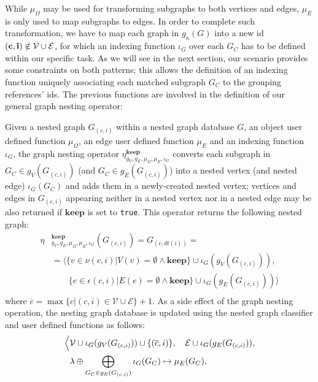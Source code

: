 While $\mu_\Omega$ may be used for transforming subgraphs to both vertices and edges, $\mu_E$ is only used to map subgraphs to edges.  
In order to complete such transformation, we have to map each graph in $g_\kappa(G)$ into a new id $(\textbf{c},\textbf{i})\notin \mathcal{V}\cup \mathcal{E}$, for which an indexing function $\iota_G$ over each $G_C$ has to be defined within our specific task. As we will see in the next section, our scenario provides some constraints on both patterns; this allows the definition of an indexing function  uniquely associating each matched subgraph  $G_C$  to the grouping references' ids.
The previous functions are involved in the definition of our general graph nesting operator:



\begin{definition}
Given a nested graph $G_{(c,i)}$ within a nested graph database $G$, an object user defined function $\mu_\Omega$, an edge user defined function $\mu_E$ and an indexing function $\iota_G$, the graph nesting operator $\eta_{g_V,g_E,\mu_\Omega,\mu_E,\iota_G}^{\textbf{keep}}$ converts each subgraph in $G_C\in g_V(G_{(c,i)})$ (and $G_C\in g_E(G_{(c,i)})$) into a nested vertex (and nested edge) $\iota_G(G_C)$ and adds them in a newly-created nested vertex; vertices and edges in $G_{(c,i)}$ appearing neither in a nested vertex nor in a nested edge may be also returned if $\textbf{keep}$ is set to \texttt{true}. This operator returns the following nested graph:
\[\begin{split}
\eta&{}_{g_V,g_E,\mu_\Omega,\mu_E,\iota_G}^{\textbf{keep}}(G_{(c,i)})=G_{(\overline{c},dt(i))}=\\
&=\Big\langle \{v\in \nu(c,i) | V(v)=\emptyset\wedge\textbf{keep} \}\cup \iota_G(g_V(G_{(c,i)})),\\
&\qquad \{e\in \epsilon(c,i) | E(e)=\emptyset\wedge\textbf{keep} \}\cup \iota_G(g_E(G_{(c,i)}))\Big\rangle\\
\end{split}\]
where $\overline{c}=\max\{c|(c,i)\in\mathcal{V}\cup\mathcal{E}\}+1$. As a side effect of the graph nesting operation, the nesting graph database is updated using the nested graph classifier and user defined functions as follows:
	\begin{align*}
	\Big\langle&\VS\cup \iota_G(g_V(G_{(c,i)}))\cup\{(\overline{c},i)\},\quad \ES\cup \iota_G(g_E(G_{(c,i)})),\\
	& \lambda\oplus \bigoplus_{G_C\in g_E(G_{(c,i)})}\iota_G(G_C)\mapsto \mu_E(G_C),\\

\end{align*}
\end{definition}
